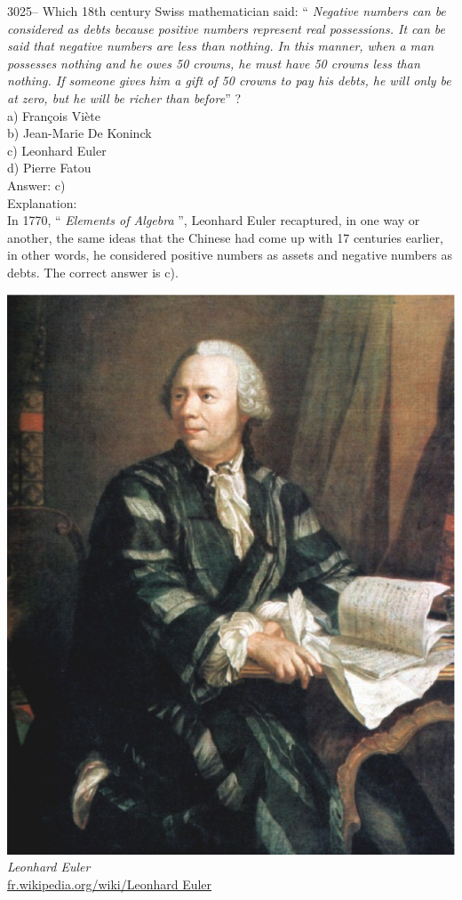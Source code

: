 \documentclass[letterpaper, 12pt]{article}
\begin{document}
3025-- Which 18th century Swiss mathematician said: `` \emph{Negative numbers can be considered as debts because positive numbers represent real possessions. It can be said that negative numbers are less than nothing. In this manner, when a man possesses nothing and he owes 50 crowns, he must have 50 crowns less than nothing. If someone gives him a gift of 50 crowns to pay his debts, he will only be at zero, but he will be richer than before}'' ?\\[2mm]

a) Fran\c cois Vi\`ete\\
b) Jean-Marie De Koninck\\
c) Leonhard Euler\\
d) Pierre Fatou\\

Answer: c)\\

Explanation:\\
In 1770, `` \emph{Elements of Algebra} '', Leonhard Euler recaptured, in one way or another, the same ideas that the Chinese had come up with 17 centuries earlier, in other words,  he considered positive numbers as assets and negative numbers as debts. The correct answer is c).\\

\begin{center}
\includegraphics[scale=0.15]{Euler.eps}\\
\emph{{\small Leonhard Euler}}\\
\href{http://fr.wikipedia.org/wiki/Leonhard Euler}{fr.wikipedia.org/wiki/Leonhard Euler}\\[5mm]
\end{center}
\end{document}

